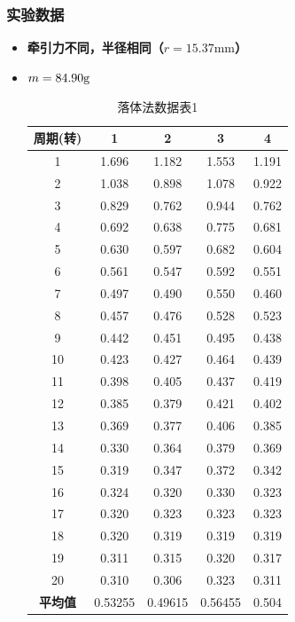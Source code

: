 \documentclass[12pt,hyperref,a4paper,UTF8]{ctexart}
\begin{document}
\subsubsection{实验数据}
    \begin{itemize}
        \item \textbf{牵引力不同，半径相同（$r=15.37\text{mm}$）}
            \item $m=84.90\text g$
            
                \begin{table}[H]
                \centering
                \begin{tabular}{ccccc}
                \toprule
                \textbf{周期(转)} & \textbf{1} & \textbf{2} & \textbf{3} & \textbf{4} \\
                \midrule
                1  & 1.696 & 1.182 & 1.553 & 1.191 \\
                2  & 1.038 & 0.898 & 1.078 & 0.922 \\
                3  & 0.829 & 0.762 & 0.944 & 0.762 \\
                4  & 0.692 & 0.638 & 0.775 & 0.681 \\
                5  & 0.630 & 0.597 & 0.682 & 0.604 \\
                6  & 0.561 & 0.547 & 0.592 & 0.551 \\
                7  & 0.497 & 0.490 & 0.550 & 0.460 \\
                8  & 0.457 & 0.476 & 0.528 & 0.523 \\
                9  & 0.442 & 0.451 & 0.495 & 0.438 \\
                10 & 0.423 & 0.427 & 0.464 & 0.439 \\
                11 & 0.398 & 0.405 & 0.437 & 0.419 \\
                12 & 0.385 & 0.379 & 0.421 & 0.402 \\
                13 & 0.369 & 0.377 & 0.406 & 0.385 \\
                14 & 0.330 & 0.364 & 0.379 & 0.369 \\
                15 & 0.319 & 0.347 & 0.372 & 0.342 \\
                16 & 0.324 & 0.320 & 0.330 & 0.323 \\
                17 & 0.320 & 0.323 & 0.323 & 0.323 \\
                18 & 0.320 & 0.319 & 0.319 & 0.319 \\
                19 & 0.311 & 0.315 & 0.320 & 0.317 \\
                20 & 0.310 & 0.306 & 0.323 & 0.311 \\
                \midrule
                \textbf{平均值} & 0.53255 & 0.49615 & 0.56455 & 0.504 \\
                \bottomrule
                \end{tabular}
                \caption{落体法数据表1}
                \end{table}


\end{itemize}
\end{document}
